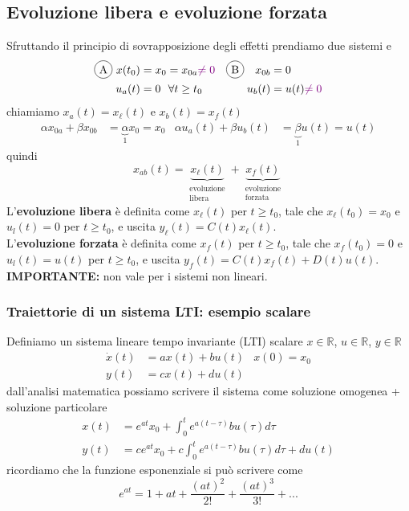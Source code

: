 \documentclass{article}
\begin{document}
\subsection{Evoluzione libera e evoluzione forzata}
Sfruttando il principio di sovrapposizione degli effetti prendiamo due sistemi  e  
\begin{align*}
   \circled{A} \ x(t_0) &= x_0 =x_{0a} {\color{violet} \neq 0} & \circled{B} \ \ \ x_{0b}&=0\\
    u_a(t) &= 0 \ \ \forall t \geq t_0 & u_b(t) &= u(t) {\color{violet}\neq 0}
\end{align*}
chiamiamo $x_a(t)=x_\ell(t)$ e $x_b(t) = x_f(t)$
\begin{align*}
    \alpha x_{0a} + \beta x_{0b} &= \underbrace{\alpha}_{1} x_0 = x_0 & 
    \alpha u_a(t) + \beta u_b(t) &= \underbrace{\beta}_{1}u(t) = u(t)
\end{align*}
quindi
\[
    x_{ab}(t) = \underbrace{x_\ell(t)}_{\substack{\text{evoluzione} \\ \text{libera}}} + \underbrace{x_f(t)}_{\substack{\text{evoluzione} \\ \text{forzata}}}
\]
L'\textbf{evoluzione libera} è definita come $x_\ell(t)$ per $t \geq t_0$, tale che $x_\ell (t_0)=x_0$ e $u_l(t)=0$ per $t \geq t_0$, e uscita $y_\ell(t)=C(t)x_\ell(t)$.\\
L'\textbf{evoluzione forzata} è definita come $x_f(t)$ per $t \geq t_0$, tale che $x_f (t_0)=0$ e $u_l(t)=u(t)$ per $t \geq t_0$, e uscita $y_f(t)=C(t)x_f(t)+D(t)u(t)$.
\vspace*{0.2cm}\\
\textbf{IMPORTANTE:} non vale per i sistemi non lineari.


\subsubsection{Traiettorie di un sistema LTI: esempio scalare}
Definiamo un sistema lineare tempo invariante (LTI) scalare $x \in \mathbb{R}$, $u \in \mathbb{R}$, $y \in \mathbb{R}$
\begin{align*}
    \dot x(t) &= ax(t) + bu(t) &x(0) = x_0\\
    y(t) &= cx(t) + du(t)
\end{align*}
dall'analisi matematica possiamo scrivere il sistema come soluzione omogenea + soluzione particolare
\begin{align*}
    x(t) &= e^{at}x_0 + \int_0^t e^{a(t-\tau)}bu(\tau) d \tau \\
    y(t) &= ce^{at}x_0 + c \int_0^t e^{a(t-\tau)}bu(\tau) d \tau + du(t)
\end{align*}
ricordiamo che la funzione esponenziale si può scrivere come
\[
    e^{at} = 1 + at + \frac{(at)^2}{2!} + \frac{(at)^3}{3!} + ...
\]
\end{document}
